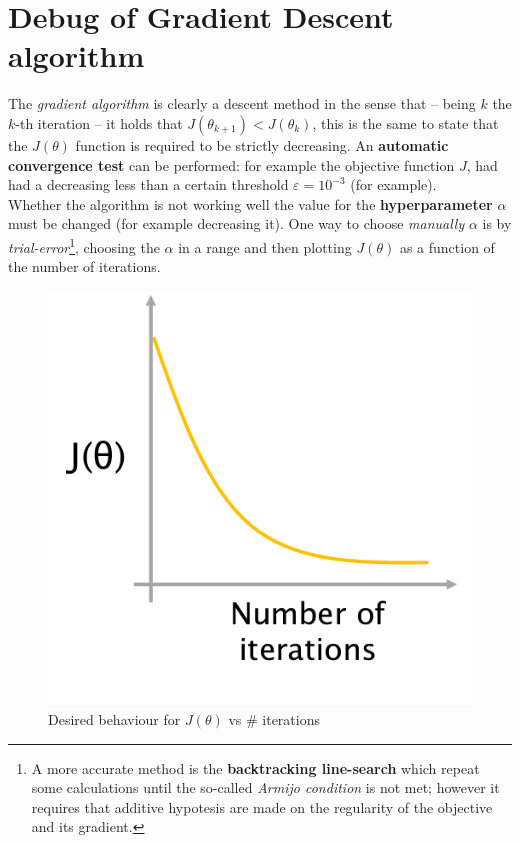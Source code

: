 \section{Debug of Gradient Descent algorithm}
The \textit{gradient algorithm} is clearly a descent method in the sense that -- being $k$ the $k$-th iteration -- it holds that $J(\theta_{k+1}) < J(\theta_{k})$, this is the same to state that the $J(\theta)$ function is required to be strictly decreasing. An \textbf{automatic convergence test} can be performed: for example the objective function $J$, had had a decreasing less than a certain threshold $\varepsilon=10^{-3}$ (for example).\\
Whether the algorithm is not working well the value for the \textbf{hyperparameter} $\alpha$ must be changed (for example decreasing it). One way to choose \textit{manually} $\alpha$ is by \textit{trial-error}\footnote{
    A more accurate method is the \textbf{backtracking line-search} which repeat some calculations until the so-called \textit{Armijo condition} is not met; however it requires that additive hypotesis are made on the regularity of the objective and its gradient.
}, choosing the $\alpha$ in a range and then plotting $J(\theta)$ as a function of the number of iterations. 

\begin{figure}[h]
    \centering
    \includegraphics[scale=0.6]{img/alpha.png}
    \caption{Desired behaviour for $J(\theta)$ vs \# iterations}
\end{figure}
 
